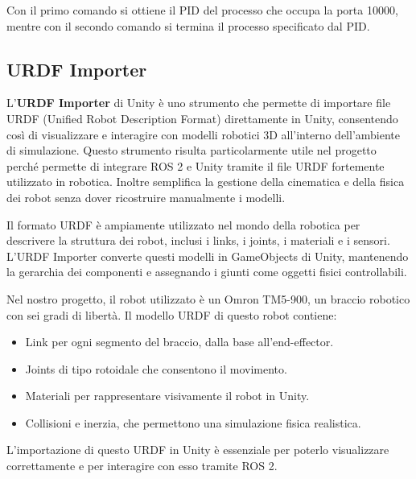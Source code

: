 \documentclass[11pt]{report}
\begin{document}
Con il primo comando si ottiene il PID del processo che occupa la porta 10000, mentre con il secondo comando si termina il processo specificato dal PID.


\subsection{URDF Importer}
\label{sec:urdf_importer}
L'\textbf{URDF Importer} \cite{URDF-Importer} di Unity è uno strumento che permette di importare file URDF (Unified Robot Description Format) direttamente in Unity, consentendo così di visualizzare e interagire con modelli robotici 3D all'interno dell'ambiente di simulazione. Questo strumento risulta particolarmente utile nel progetto perché permette di integrare ROS 2 e Unity tramite il file URDF fortemente utilizzato in robotica. Inoltre semplifica la gestione della cinematica e della fisica dei robot senza dover ricostruire manualmente i modelli.

Il formato URDF è ampiamente utilizzato nel mondo della robotica per descrivere la struttura dei robot, inclusi i links, i joints, i materiali e i sensori. L'URDF Importer converte questi modelli in GameObjects di Unity, mantenendo la gerarchia dei componenti e assegnando i giunti come oggetti fisici controllabili.

Nel nostro progetto, il robot utilizzato è un Omron TM5-900, un braccio robotico con sei gradi di libertà. Il modello URDF di questo robot contiene:
\begin{itemize}
    \item Link per ogni segmento del braccio, dalla base all'end-effector.
    \item Joints di tipo rotoidale che consentono il movimento.
    \item Materiali per rappresentare visivamente il robot in Unity.
    \item Collisioni e inerzia, che permettono una simulazione fisica realistica.
\end{itemize}

L'importazione di questo URDF in Unity è essenziale per poterlo visualizzare correttamente e per interagire con esso tramite ROS 2.
\end{document}
